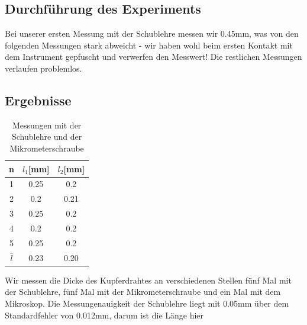 \documentclass{article}
\begin{document}
\subsection{Durchführung des Experiments}
Bei unserer ersten Messung mit der Schublehre messen wir 0.45mm, was von den folgenden Messungen stark abweicht - wir haben wohl beim ersten Kontakt mit dem Instrument gepfuscht und verwerfen den Messwert! Die restlichen Messungen verlaufen problemlos.
\subsection{Ergebnisse}

\begin{table}
\centering
\begin{tabular}{|c|c|c|}
\hline
n&$l_1$[mm]&$l_2$[mm]\\
\hline
\hline
1&0.25&0.2\\
2&0.2&0.21\\
3&0.25&0.2\\
4&0.2&0.2\\
5&0.25&0.2\\
\hline 
$\bar{l}$&0.23&0.20\\
\hline
\end{tabular}
\caption{Messungen mit der Schublehre und der Mikrometerschraube}
\end{table}

Wir messen die Dicke des Kupferdrahtes an verschiedenen Stellen  fünf Mal mit der Schublehre, fünf Mal mit der Mikrometerschraube und ein Mal mit dem Mikroskop.  Die Messungenauigkeit der Schublehre liegt mit 0.05mm über dem Standardfehler von 0.012mm, darum ist die Länge hier
\end{document}
